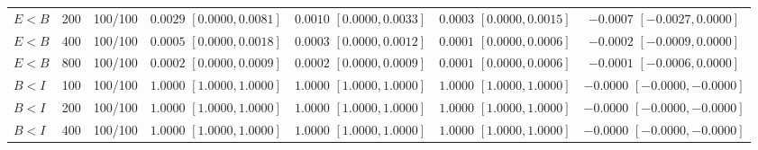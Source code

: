 \documentclass[12pt,letterpaper]{article}
\theoremstyle{plain}
\theoremstyle{definition}
\begin{document}
\begin{table}[p]
\begin{adjustbox}{max width=\linewidth}
\begin{tabular}{lrccccc}
$E<B$ & 200 & 100/100 & \shortstack{$0.0029$\\{\scriptsize$[0.0000,0.0081]$}} & \shortstack{$0.0010$\\{\scriptsize$[0.0000,0.0033]$}} & \shortstack{$0.0003$\\{\scriptsize$[0.0000,0.0015]$}} & \shortstack{$-0.0007$\\{\scriptsize$[-0.0027,0.0000]$}}\\
$E<B$ & 400 & 100/100 & \shortstack{$0.0005$\\{\scriptsize$[0.0000,0.0018]$}} & \shortstack{$0.0003$\\{\scriptsize$[0.0000,0.0012]$}} & \shortstack{$0.0001$\\{\scriptsize$[0.0000,0.0006]$}} & \shortstack{$-0.0002$\\{\scriptsize$[-0.0009,0.0000]$}}\\
$E<B$ & 800 & 100/100 & \shortstack{$0.0002$\\{\scriptsize$[0.0000,0.0009]$}} & \shortstack{$0.0002$\\{\scriptsize$[0.0000,0.0009]$}} & \shortstack{$0.0001$\\{\scriptsize$[0.0000,0.0006]$}} & \shortstack{$-0.0001$\\{\scriptsize$[-0.0006,0.0000]$}}\\
\addlinespace
$B<I$ & 100 & 100/100 & \shortstack{$1.0000$\\{\scriptsize$[1.0000,1.0000]$}} & \shortstack{$1.0000$\\{\scriptsize$[1.0000,1.0000]$}} & \shortstack{$1.0000$\\{\scriptsize$[1.0000,1.0000]$}} & \shortstack{$-0.0000$\\{\scriptsize$[-0.0000,-0.0000]$}}\\
$B<I$ & 200 & 100/100 & \shortstack{$1.0000$\\{\scriptsize$[1.0000,1.0000]$}} & \shortstack{$1.0000$\\{\scriptsize$[1.0000,1.0000]$}} & \shortstack{$1.0000$\\{\scriptsize$[1.0000,1.0000]$}} & \shortstack{$-0.0000$\\{\scriptsize$[-0.0000,-0.0000]$}}\\
$B<I$ & 400 & 100/100 & \shortstack{$1.0000$\\{\scriptsize$[1.0000,1.0000]$}} & \shortstack{$1.0000$\\{\scriptsize$[1.0000,1.0000]$}} & \shortstack{$1.0000$\\{\scriptsize$[1.0000,1.0000]$}} & \shortstack{$-0.0000$\\{\scriptsize$[-0.0000,-0.0000]$}}\\

\end{tabular}
\end{adjustbox}
\end{table}
\end{document}
